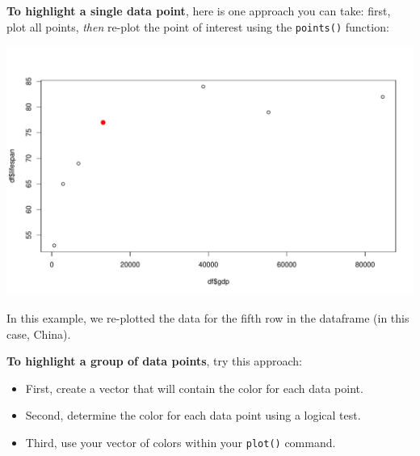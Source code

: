 \documentclass[
]{book}
\newenvironment{Shaded}{\begin{snugshade}}{\end{snugshade}}
\newcommand{\DataTypeTok}[1]{\textcolor[rgb]{0.13,0.29,0.53}{#1}}
\newcommand{\DecValTok}[1]{\textcolor[rgb]{0.00,0.00,0.81}{#1}}
\newcommand{\FloatTok}[1]{\textcolor[rgb]{0.00,0.00,0.81}{#1}}
\newcommand{\KeywordTok}[1]{\textcolor[rgb]{0.13,0.29,0.53}{\textbf{#1}}}
\newcommand{\NormalTok}[1]{#1}
\newcommand{\OperatorTok}[1]{\textcolor[rgb]{0.81,0.36,0.00}{\textbf{#1}}}
\newcommand{\StringTok}[1]{\textcolor[rgb]{0.31,0.60,0.02}{#1}}
\begin{document}
\textbf{To highlight a single data point}, here is one approach you can take: first, plot all points, \emph{then} re-plot the point of interest using the \texttt{points()} function:

\begin{Shaded}
\end{Shaded}

\includegraphics{figures/unnamed-chunk-106-1.pdf}

In this example, we re-plotted the data for the fifth row in the dataframe (in this case, China).

\textbf{To highlight a group of data points}, try this approach:

\begin{itemize}
\item
  First, create a vector that will contain the color for each data point.
\item
  Second, determine the color for each data point using a logical test.
\item
  Third, use your vector of colors within your \texttt{plot()} command.
\end{itemize}
\end{document}
